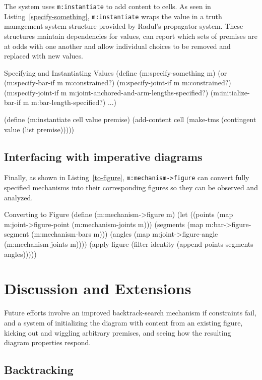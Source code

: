 The system uses \texttt{m:instantiate} to add content to cells. As
seen in Listing~\ref{specify-something}, \texttt{m:instantiate} wraps
the value in a truth management system structure provided by Radul's
propagator system. These structures maintain dependencies for values, can report
which sets of premises are at odds with one another and allow
individual choices to be removed and replaced with new values.
\enlargethispage*{\baselineskip}
\begin{code-listing}
[label=specify-something]
{Specifying and Instantiating Values}
(define (m:specify-something m)
  (or
   (m:specify-bar-if m m:constrained?)
   (m:specify-joint-if m m:constrained?)
   (m:specify-joint-if m m:joint-anchored-and-arm-lengths-specified?)
   (m:initialize-bar-if m m:bar-length-specified?)
   ...)

(define (m:instantiate cell value premise)
  (add-content cell (make-tms (contingent value (list premise)))))
\end{code-listing}

\subsection{Interfacing with imperative diagrams}

Finally, as shown in Listing~\ref{to-figure},
\texttt{m:mechanism->figure} can convert fully specified mechanisms
into their corresponding figures so they can be observed and analyzed.

\begin{code-listing}
[label=to-figure]
{Converting to Figure}
(define (m:mechanism->figure m)
  (let ((points (map m:joint->figure-point (m:mechanism-joints m)))
        (segments (map m:bar->figure-segment (m:mechanism-bars m)))
        (angles (map m:joint->figure-angle (m:mechanism-joints m))))
    (apply figure (filter identity (append points segments angles)))))
\end{code-listing}

\section{Discussion and Extensions}

Future efforts involve an improved backtrack-search mechanism if
constraints fail, and a system of initializing the diagram with
content from an existing figure, kicking out and wiggling arbitrary
premises, and seeing how the resulting diagram properties respond.

\subsection{Backtracking}

